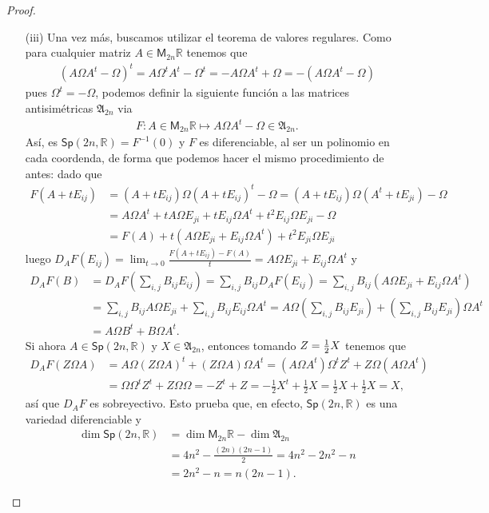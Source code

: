 \documentclass[11pt]{article}
\newcommand{\R}{\mathbb{R}}
\newcommand{\C}{\mathbb{C}}
\newcommand{\M}[2]{\mathsf{M}_{#1}#2}
\begin{document}
\begin{proof}
\begin{itemize}
\begin{align*}
&= \frac{1}{2}H+ \frac{1}{2}H^* \stackrel{(H \in \mathcal{H}_n)}{=} \frac{1}{2}H+ \frac{1}{2}H = H.
\end{align*}
Concluimos entonces que $\mathsf{U}(n,\C)$ es una variedad diferenciable y su dimensi\'on es exactametnte $\dim \mathsf{U}(n,\C) = \dim \M{n}{\C} - \dim \mathcal{H}_n = 2n^2 -n^2 = n^2$.
\item[(iii)] Una vez m\'as, buscamos utilizar el teorema de valores regulares. Como para cualquier matriz $A \in \M{2n}{\R}$ tenemos que 
\begin{align*}
(A\Omega A^t - \Omega)^t = A\Omega^t A^t - \Omega^t = -A\Omega A^t + \Omega = -(A\Omega A^t - \Omega)
\end{align*}
pues $\Omega^t = -\Omega$, podemos definir la siguiente funci\'on a las matrices antisim\'etricas $\mathfrak{A}_{2n}$ via
\begin{align*}
F : A \in \M{2n}{\R} \mapsto A\Omega A^t - \Omega \in \mathfrak{A}_{2n}.
\end{align*}
As\'i, es $\mathsf{Sp}(2n,\R) = F^{-1}(0)$ y $F$ es diferenciable, al ser un polinomio en cada coordenda, de forma que podemos hacer el mismo procedimiento de antes: dado que
\begin{align*}
F(A+tE_{ij}) &= (A+tE_{ij})\Omega(A+tE_{ij})^t - \Omega = (A+tE_{ij})\Omega(A^t+tE_{ji}) - \Omega \\
& = A\Omega A^t + tA\Omega E_{ji} + tE_{ij}\Omega A^t + t^2E_{ij}\Omega E_{ji} - \Omega\\
& = F(A) + t(A\Omega E_{ji} + E_{ij}\Omega A^t) +t^2E_{ji}\Omega E_{ji}
\end{align*}
luego $D_AF(E_{ij}) = \lim_{t \to 0}\frac{F(A+tE_{ij})-F(A)}{t} = A\Omega E_{ji} + E_{ij}\Omega A^t$ y
\begin{align*}
D_AF(B) &= D_AF\left(\sum_{i,j}B_{ij}E_{ij}\right) = \sum_{i,j}B_{ij}D_AF(E_{ij}) = \sum_{i,j}B_{ij}(A\Omega E_{ji} + E_{ij}\Omega A^t) \\
& = \sum_{i,j}B_{ij}A\Omega E_{ji} + \sum_{i,j}B_{ij}E_{ij}\Omega A^t = A\Omega\left(\sum_{i,j}B_{ij}E_{ji}\right) + \left(\sum_{i,j}B_{ij}E_{ji}\right)\Omega A^t\\
& = A \Omega B^t + B\Omega A^t.
\end{align*}
Si ahora $A \in \mathsf{Sp}(2n,\R)$ y $X \in \mathfrak{A}_{2n}$, entonces tomando $Z = \small{\frac{1}{2}}X$ tenemos que
\begin{align*}
D_AF(Z\Omega A) &= A \Omega (Z\Omega A)^t + (Z\Omega A)\Omega A^t = (A \Omega A^t)\Omega^t Z^t + Z\Omega(A\Omega A^t)\\
& = \Omega\Omega^t Z^t + Z\Omega\Omega = -Z^t + Z = -\frac{1}{2}X^t + \frac{1}{2}X = \frac{1}{2}X + \frac{1}{2}X = X,
\end{align*}
as\'i que $D_A F$ es sobreyectivo. Esto prueba que, en efecto, $\mathsf{Sp}(2n,\R)$ es una variedad diferenciable y
\begin{align*}
\dim \mathsf{Sp}(2n,\R) &= \dim \M{2n}{\R}- \dim \mathfrak{A}_{2n}\\
& = 4n^2 - \frac{(2n)(2n-1)}{2} = 4n^2-2n^2-n\\
& = 2n^2 - n = n(2n-1).
\end{align*}
\end{itemize}
\end{proof}
\end{document}
